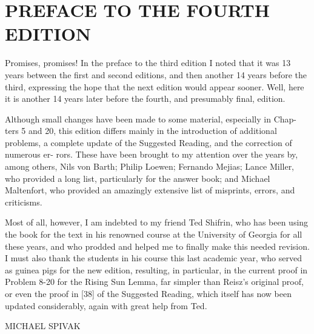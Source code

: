 \section*{PREFACE TO THE FOURTH EDITION}

Promises, promises! In the preface to the third edition I noted that it was 13 years
between the first and second editions, and then another 14 years before the third,
expressing the hope that the next edition would appear sooner. Well, here it is
another 14 years later before the fourth, and presumably final, edition.

Although small changes have been made to some material, especially in Chap-
ters 5 and 20, this edition differs mainly in the introduction of additional problems,
a complete update of the Suggested Reading, and the correction of numerous er-
rors. These have been brought to my attention over the years by, among others,
Nils von Barth; Philip Loewen; Fernando Mejias; Lance Miller, who provided a
long list, particularly for the answer book; and Michael Maltenfort, who provided
an amazingly extensive list of misprints, errors, and criticisms.

Most of all, however, I am indebted to my friend Ted Shifrin, who has been
using the book for the text in his renowned course at the University of Georgia
for all these years, and who prodded and helped me to finally make this needed
revision. I must also thank the students in his course this last academic year, who
served as guinea pigs for the new edition, resulting, in particular, in the current
proof in Problem 8-20 for the Rising Sun Lemma, far simpler than Reisz's original
proof, or even the proof in [38] of the Suggested Reading, which itself has now
been updated considerably, again with great help from Ted.

MICHAEL SPIVAK